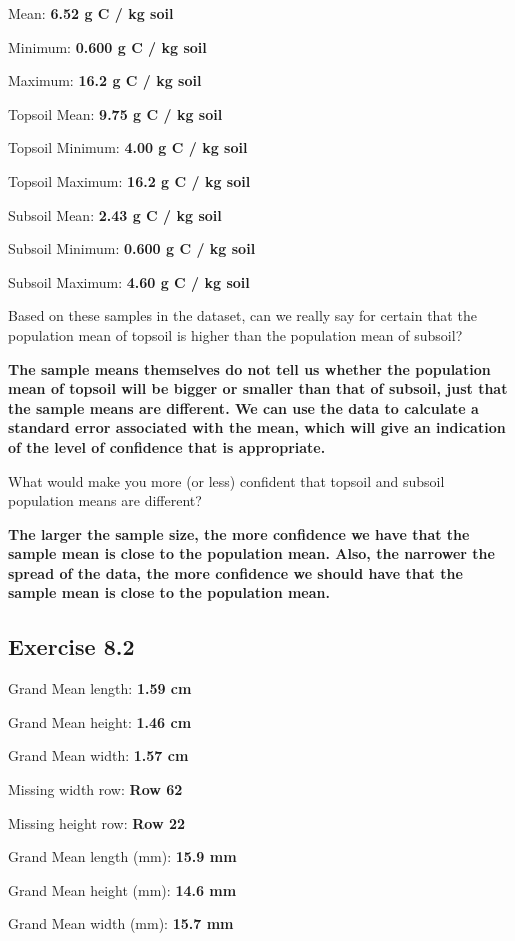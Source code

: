 \documentclass[
  openany]{scrbook}
\begin{document}
Mean: \textbf{6.52 g C / kg soil}

Minimum: \textbf{0.600 g C / kg soil}

Maximum: \textbf{16.2 g C / kg soil}

Topsoil Mean: \textbf{9.75 g C / kg soil}

Topsoil Minimum: \textbf{4.00 g C / kg soil}

Topsoil Maximum: \textbf{16.2 g C / kg soil}

Subsoil Mean: \textbf{2.43 g C / kg soil}

Subsoil Minimum: \textbf{0.600 g C / kg soil}

Subsoil Maximum: \textbf{4.60 g C / kg soil}

Based on these samples in the dataset, can we really say for certain that the population mean of topsoil is higher than the population mean of subsoil?

\textbf{The sample means themselves do not tell us whether the population mean of topsoil will be bigger or smaller than that of subsoil, just that the sample means are different. We can use the data to calculate a standard error associated with the mean, which will give an indication of the level of confidence that is appropriate.}

What would make you more (or less) confident that topsoil and subsoil population means are different?

\textbf{The larger the sample size, the more confidence we have that the sample mean is close to the population mean. Also, the narrower the spread of the data, the more confidence we should have that the sample mean is close to the population mean.}

\hypertarget{exercise-8.2}{%
\subsection{Exercise 8.2}\label{exercise-8.2}}

Grand Mean length: \textbf{1.59 cm}

Grand Mean height: \textbf{1.46 cm}

Grand Mean width: \textbf{1.57 cm}

Missing width row: \textbf{Row 62}

Missing height row: \textbf{Row 22}

Grand Mean length (mm): \textbf{15.9 mm}

Grand Mean height (mm): \textbf{14.6 mm}

Grand Mean width (mm): \textbf{15.7 mm}
\end{document}
